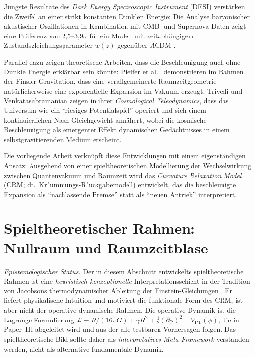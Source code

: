 \documentclass[aps,prd,twocolumn,superscriptaddress,nofootinbib]{revtex4-2}
\begin{document}
J\"ungste Resultate des \textit{Dark Energy Spectroscopic Instrument} (DESI) verst\"arken die Zweifel an einer strikt konstanten Dunklen Energie: Die Analyse baryonischer akustischer Oszillationen in Kombination mit CMB- und Supernova-Daten zeigt eine Pr\"aferenz von 2,5--3,9$\sigma$ f\"ur ein Modell mit zeitabh\"angigem Zustandsgleichungsparameter $w(z)$ gegen\"uber $\Lambda$CDM \cite{DESI2024}.

Parallel dazu zeigen theoretische Arbeiten, dass die Beschleunigung auch ohne Dunkle Energie erkl\"arbar sein k\"onnte: Pfeifer et al.\ \cite{Pfeifer2025} demonstrieren im Rahmen der Finsler-Gravitation, dass eine verallgemeinerte Raumzeitgeometrie nat\"urlicherweise eine exponentielle Expansion im Vakuum erzeugt. Trivedi und Venkatasubramanian \cite{Trivedi2025} zeigen in ihrer \textit{Cosmological Teleodynamics}, dass das Universum wie ein ``riesiges Potentialspiel'' operiert und sich einem kontinuierlichen Nash-Gleichgewicht ann\"ahert, wobei die kosmische Beschleunigung als emergenter Effekt dynamischen Ged\"achtnisses in einem selbstgravitierenden Medium erscheint.

Die vorliegende Arbeit verkn\"upft diese Entwicklungen mit einem eigenst\"andigen Ansatz: Ausgehend von einer spieltheoretischen Modellierung der Wechselwirkung zwischen Quantenvakuum und Raumzeit wird das \textit{Curvature Relaxation Model} (CRM; dt.\ Kr"ummungs-R"uckgabemodell) entwickelt, das die beschleunigte Expansion als ``nachlassende Bremse'' statt als ``neuen Antrieb'' interpretiert.

\section{Spieltheoretischer Rahmen: Nullraum und Raumzeitblase}
\label{sec:spieltheorie}

\textit{Epistemologischer Status.} Der in diesem Abschnitt entwickelte spieltheoretische Rahmen ist eine \emph{heuristisch-konzeptionelle} Interpretationsschicht in der Tradition von Jacobsons thermodynamischer Ableitung der Einstein-Gleichungen \cite{Jacobson1995}. Er liefert physikalische Intuition und motiviert die funktionale Form des CRM, ist aber nicht der operative dynamische Rahmen. Die operative Dynamik ist die Lagrange-Formulierung $\mathcal{L} = R/(16\pi G) + \gamma R^2 + \frac{1}{2}(\partial\phi)^2 - V_{\mathrm{PT}}(\phi)$, die in Paper~III \cite{Geiger2026c} abgeleitet wird und aus der alle testbaren Vorhersagen folgen. Das spieltheoretische Bild sollte daher als \emph{interpretatives Meta-Framework} verstanden werden, nicht als alternative fundamentale Dynamik.
\end{document}
